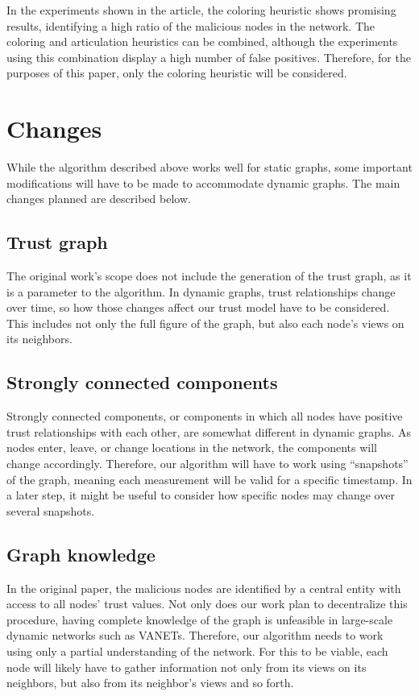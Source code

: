 In the experiments shown in the article, the coloring heuristic shows promising results, identifying a high ratio of the malicious nodes in the network.
The coloring and articulation heuristics can be combined, although the experiments using this combination display a high number of false positives.
Therefore, for the purposes of this paper, only the coloring heuristic will be considered.

\section{Changes}
While the algorithm described above works well for static graphs, some important modifications will have to be made to accommodate dynamic graphs.
The main changes planned are described below.

\subsection{Trust graph}
The original work's scope does not include the generation of the trust graph, as it is a parameter to the algorithm.
In dynamic graphs, trust relationships change over time, so how those changes affect our trust model have to be considered.
This includes not only the full figure of the graph, but also each node's views on its neighbors.

\subsection{Strongly connected components}
Strongly connected components, or components in which all nodes have positive trust relationships with each other, are somewhat different in dynamic graphs.
As nodes enter, leave, or change locations in the network, the components will change accordingly.
Therefore, our algorithm will have to work using ``snapshots'' of the graph, meaning each measurement will be valid for a specific timestamp.
In a later step, it might be useful to consider how specific nodes may change over several snapshots.

\subsection{Graph knowledge}
In the original paper, the malicious nodes are identified by a central entity with access to all nodes' trust values.
Not only does our work plan to decentralize this procedure, having complete knowledge of the graph is unfeasible in large-scale dynamic networks such as VANETs.
Therefore, our algorithm needs to work using only a partial understanding of the network.
For this to be viable, each node will likely have to gather information not only from its views on its neighbors, but also from its neighbor's views and so forth.

